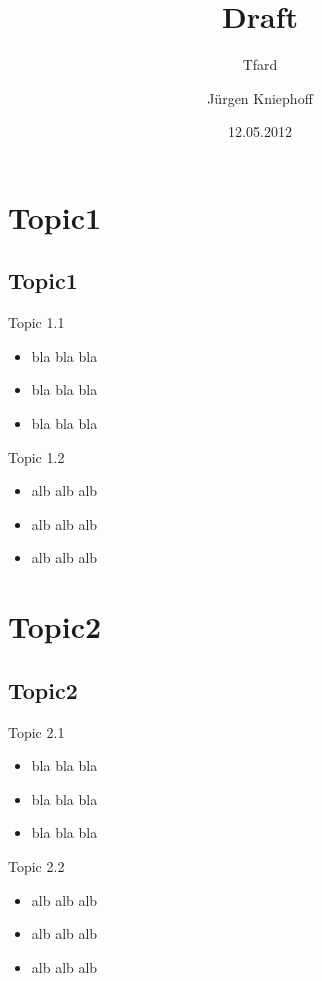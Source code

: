 \documentclass{beamer}
\author[JK]{Jürgen Kniephoff}
\institute[oi01]{www.oi01.de}
\title[draft]{Draft}
\subtitle[tfard]{Tfard}
\date[Mai 2012]{12.05.2012}
\begin{document}
\begin{frame}
  \titlepage
\end{frame}

\begin{frame}
  \tableofcontents
\end{frame}



\section{Topic1}
\subsection{Topic1}

\begin{frame}{Topic 1.1}
	\begin{itemize}
		\item bla bla bla
		\item bla bla bla
        \item bla bla bla
    \end{itemize}
\end{frame}

\begin{frame}{Topic 1.2}
	\begin{itemize}
		\item alb alb alb
		\item alb alb alb
        \item alb alb alb
    \end{itemize}
\end{frame}



\section{Topic2}
\subsection{Topic2}

\begin{frame}{Topic 2.1}
	\begin{itemize}
		\item bla bla bla
		\item bla bla bla
        \item bla bla bla
    \end{itemize}
\end{frame}

\begin{frame}{Topic 2.2}
	\begin{itemize}
		\item alb alb alb
		\item alb alb alb
        \item alb alb alb
    \end{itemize}
\end{frame}
\end{document}
